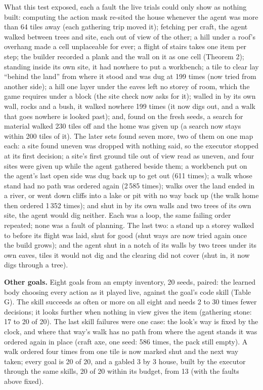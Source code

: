 What this test exposed, each a fault the live trials could only show as nothing built: computing the action mask
re-sited the house whenever the agent was more than 64 tiles away (each gathering trip moved it); fetching per craft,
the agent walked between trees and site, each out of view of the other; a hill under a roof's overhang made a cell
unplaceable for ever; a flight of stairs takes one item per step; the builder recorded a plank and the wall on it as
one cell (Theorem 2); standing inside its own site, it had nowhere to put a workbench; a tile to clear lay ``behind
the land'' from where it stood and was dug at 199 times (now tried from another side); a hill one layer under the
eaves left no storey of room, which the game requires under a block (the site check now asks for it); walled in by
its own wall, rocks and a bush, it walked nowhere 199 times (it now digs out, and a walk that goes nowhere is
looked past); and, found on the fresh seeds, a search for material walked 230 tiles off and the home was given up
(a search now stays within 200 tiles of it). The later sets found seven more, two of them on one map each: a site
found uneven was dropped with nothing said, so the executor stopped at its first decision; a site's first ground tile
out of view read as uneven, and four sites were given up while the agent gathered beside them; a workbench put on
the agent's last open side was dug back up to get out (611 times); a walk whose stand had no path was ordered again
(2\,585 times); walks over the land ended in a river, or went down cliffs into a lake or pit with no way back up
(the walk home then ordered 1\,352 times); and shut in by its own walls and two trees of its own site, the agent
would dig neither. Each was a loop, the same failing order repeated; none was a fault of planning. The last two: a stand
up a storey walked to before its flight was laid, shut for good (shut ways are now tried again once the build grows);
and the agent shut in a notch of its walls by two trees under its own eaves, tiles it would not dig and the clearing
did not cover (shut in, it now digs through a tree).

\textbf{Other goals.} Eight goals from an empty inventory, 20 seeds, paired: the learned body choosing every action
as it played live, against the goal's code skill (Table G). The skill succeeds as often or more on all eight and
needs 2 to 30 times fewer decisions; it looks further when nothing in view gives the item (gathering stone: 17 to
20 of 20). The last skill failures were one case: the look's way is fixed by the clock, and where that way's walk has
no path from where the agent stands it was ordered again in place (craft axe, one seed: 586 times, the pack still
empty). A walk ordered four times from one tile is now marked shut and the next way taken; every goal is 20 of 20,
and a gabled 3 by 3 house, built by the executor through the same skills, 20 of 20 within its budget, from 13 (with the faults above fixed).

